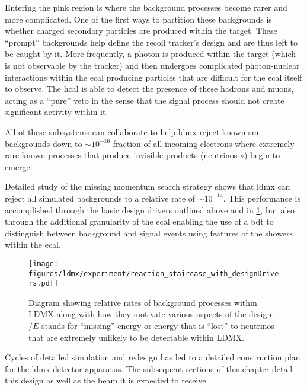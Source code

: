 Entering the pink region is where the background processes
become rarer and more complicated. One of the first ways to partition these backgrounds is
whether charged secondary particles are produced within the target. These ``prompt'' backgrounds
help define the recoil tracker's design and are thus left to be caught by it. More frequently,
a photon is produced within the target (which is not observable by the tracker) and then undergoes
complicated photon-nuclear interactions within the \ac{ecal} producing particles that are difficult
for the \ac{ecal} itself to observe. The \ac{hcal} is able to detect the presence of these hadrons
and muons, acting as a ``pure'' veto in the sense that the signal process should not create
significant activity within it.

All of these subsystems can collaborate to help \ac{ldmx} reject known \ac{sm} backgrounds
down to $\sim 10^{-16}$ fraction of all incoming electrons where extremely rare known processes
that produce invisible products (neutrinos $\nu$) begin to emerge.

Detailed study of the missing momentum search strategy\cite{ldmx-whitepaper,ldmx-photon-reject-2020,ldmx-8gev-2023} shows that \ac{ldmx} can reject all simulated backgrounds to a relative rate of $\sim 10^{-14}$.
This performance is accomplished through the basic design drivers outlined above and in \cref{fig:ldmx-bkgd-staircase}, but also through the additional granularity of the \ac{ecal} enabling
the use of a \ac{bdt} to distinguish between background and signal events using features of the
showers within the \ac{ecal}.

\begin{figure}
	\centering
	\texttt{[image: figures/ldmx/experiment/reaction\_staircase\_with\_designDrivers.pdf]}
	\caption{
		Diagram showing relative rates of background processes within LDMX along with
		how they motivate various aspects of the design. $\slash{E}$ stands for ``missing''
		energy or energy that is ``lost'' to neutrinos that are extremely unlikely to be
		detectable within LDMX.
	}
	\label{fig:ldmx-bkgd-staircase}
\end{figure}


Cycles of detailed simulation and redesign has led to a detailed construction plan for the \ac{ldmx}
detector apparatus. The subsequent sections of this chapter detail this design as well as
the beam it is expected to receive.

